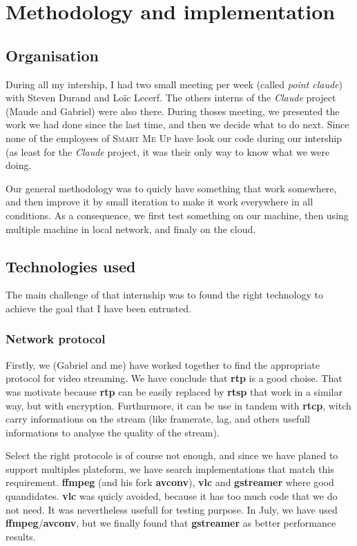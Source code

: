 \documentclass[a4paper,11pt]{custom}
\newcommand{\smu}{\textsc{Smart Me Up}}
\newcommand{\rtp}{\textbf{rtp}}
\newcommand{\rtcp}{\textbf{rtcp}}
\newcommand{\rtsp}{\textbf{rtsp}}
\newcommand{\vlc}{\textbf{vlc}}
\newcommand{\avconv}{\textbf{avconv}}
\newcommand{\ffmpeg}{\textbf{ffmpeg}}
\newcommand{\gstreamer}{\textbf{gstreamer}}
\newcommand{\claude}{\textit{Claude}}
\begin{document}
\chapter{Methodology and implementation}

\section{Organisation}

During all my intership, I had two small meeting per week (called \textit{point
claude}) with Steven Durand and Loïc Lecerf. The others interns of the \claude{}
project (Maude and Gabriel) were also there. During thoses meeting, we presented
the work we had done since the last time, and then we decide what to do next.
Since none of the employees of \smu{} have look our code during our intership (as
least for the \claude{} project, it was their only way to know what we were
doing.

Our general methodology was to quicly have something that work somewhere, and
then improve it by small iteration to make it work everywhere in all conditions.
As a consequence, we first test something on our machine, then using multiple
machine in local network, and finaly on the cloud.


\section{Technologies used}
\label{sec:technologies}

The main challenge of that internship was to found the right technology to
achieve the goal that I have been entrusted.

\subsection{Network protocol}

Firstly, we (Gabriel and me) have worked together to find the appropriate
protocol for video streaming. We have conclude that \rtp{} is a good choise.
That was motivate because \rtp{} can be easily replaced by \rtsp{} that work in
a similar way, but with encryption. Furthurmore, it can be use in tandem with
\rtcp, witch carry informations on the stream (like framerate, lag, and others
usefull informations to analyse the quality of the stream).

Select the right protocole is of course not enough, and since we have planed to
support multiples plateform, we have search implementations that match this
requirement. \ffmpeg{} (and his fork \avconv), \vlc{} and \gstreamer{} where good
quandidates. \vlc{} was quicly avoided, because it has too much code that we do
not need. It was nevertheless usefull for testing purpose. In July, we have used
\ffmpeg/\avconv, but we finally found that \gstreamer{} as better performance
results.
\end{document}
